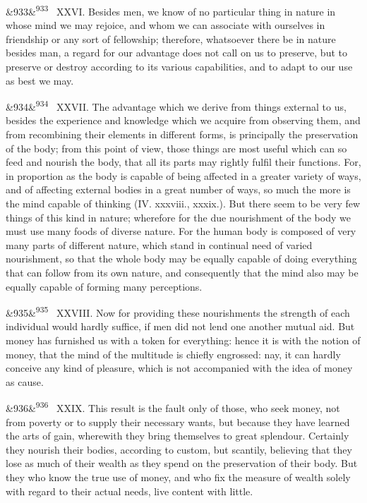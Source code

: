 \documentclass[12pt]{article}
\newcommand{\para}[1][]{\par\noindent\ifx&#1&\else\textsuperscript{\footnotesize #1}~\fi}
\begin{document}
\para[933] XXVI. Besides men, we know of no particular thing in nature in whose mind we may rejoice, and whom we can associate with ourselves in friendship or any sort of fellowship; therefore, whatsoever there be in nature besides man, a regard for our advantage does not call on us to preserve, but to preserve or destroy according to its various capabilities, and to adapt to our use as best we may.

\para[934] XXVII. The advantage which we derive from things external to us, besides the experience and knowledge which we acquire from observing them, and from recombining their elements in different forms, is principally the preservation of the body; from this point of view, those things are most useful which can so feed and nourish the body, that all its parts may rightly fulfil their functions. For, in proportion as the body is capable of being affected in a greater variety of ways, and of affecting external bodies in a great number of ways, so much the more is the mind capable of thinking (IV. xxxviii., xxxix.). But there seem to be very few things of this kind in nature; wherefore for the due nourishment of the body we must use many foods of diverse nature. For the human body is composed of very many parts of different nature, which stand in continual need of varied nourishment, so that the whole body may be equally capable of doing everything that can follow from its own nature, and consequently that the mind also may be equally capable of forming many perceptions.

\para[935] XXVIII. Now for providing these nourishments the strength of each individual would hardly suffice, if men did not lend one another mutual aid. But money has furnished us with a token for everything: hence it is with the notion of money, that the mind of the multitude is chiefly engrossed: nay, it can hardly conceive any kind of pleasure, which is not accompanied with the idea of money as cause.

\para[936] XXIX. This result is the fault only of those, who seek money, not from poverty or to supply their necessary wants, but because they have learned the arts of gain, wherewith they bring themselves to great splendour. Certainly they nourish their bodies, according to custom, but scantily, believing that they lose as much of their wealth as they spend on the preservation of their body. But they who know the true use of money, and who fix the measure of wealth solely with regard to their actual needs, live content with little.
\end{document}
